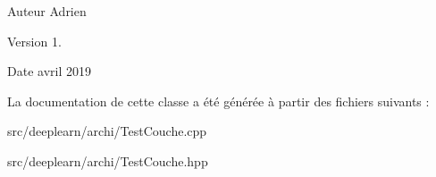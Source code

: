 \begin{DoxyAuthor}{Auteur}
Adrien 
\end{DoxyAuthor}
\begin{DoxyVersion}{Version}
1. 
\end{DoxyVersion}
\begin{DoxyDate}{Date}
avril 2019 
\end{DoxyDate}


La documentation de cette classe a été générée à partir des fichiers suivants \+:\begin{DoxyCompactItemize}
\item 
src/deeplearn/archi/Test\+Couche.\+cpp\item 
src/deeplearn/archi/Test\+Couche.\+hpp\end{DoxyCompactItemize}
